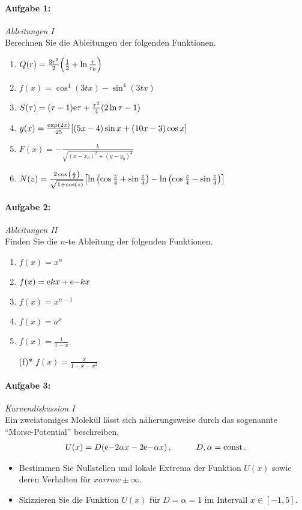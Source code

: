 
\paragraph{Aufgabe 1: } \emph{Ableitungen I}\\[0.2cm]
Berechnen Sie die Ableitungen der folgenden Funktionen.
\begin{enumerate}[label=(\alph*)]
    \item $Q(r)=\frac{3r^2}{2}\qty(\frac{1}{2}+\ln\frac{r}{r_0})$
    \item $f(x)=\cos^4(3tx)-\sin^4(3tx)$
    \item $S(\tau)=(\tau-1)\mathrm{e}{\tau}+\frac{\tau^2}{4}\qty(2\ln\tau-1)$
    \item $y(x)=\frac{\exp(2x)}{25}\qty[(5x-4)\sin x+(10x-3)\cos x]$
    \item $F(x)=-\frac{k}{\sqrt{(x-x_0)^2+(y-y_0)^2}}$
    \item $N(z)=\frac{2\cos\qty(\frac{z}{2})}{\sqrt{1+\cos(z)}}\qty[\ln\qty(\cos\frac{z}{4}+\sin\frac{z}{4})-\ln\qty(\cos\frac{z}{4}-\sin\frac{z}{4})]$
\end{enumerate}
%
\paragraph{Aufgabe 2: } \emph{Ableitungen II}\\[0.2cm]
Finden Sie die $n$-te Ableitung der folgenden Funktionen.
\begin{multicols}{2}
    \begin{enumerate}[label=(\alph*)]
        \item $f(x)=x^n$
        \item $f(x)=\mathrm{e}{kx}+\mathrm{e}{-kx}$
        \item $f(x)=x^{n-1}$
        \item $f(x)=a^x$ 
        \item $f(x)=\frac{1}{1-x}$
        \item[(f)*] $f(x)=\frac{x}{1-x-x^2}$ 
    \end{enumerate}
\end{multicols}
%
\paragraph{Aufgabe 3: } \emph{Kurvendiskussion I}\\[0.2cm]
Ein zweiatomiges Molekül lässt sich näherungsweise durch das sogenannte ``Morse-Potential'' beschreiben,
\begin{align*}
U(x)=D\qty(\mathrm{e}{-2\alpha x}-2\mathrm{e}{-\alpha x})\,, \hspace{1cm} D,\alpha=\operatorname{const}.
\end{align*}
\begin{itemize}
\item Bestimmen Sie Nullstellen und lokale Extrema der Funktion $U(x)$ sowie deren Verhalten für $xarrow\pm\infty$.
\item Skizzieren Sie die Funktion $U(x)$ für $D=\alpha=1$ im Intervall $x\in[-1,5]$.
\end{itemize}
%
